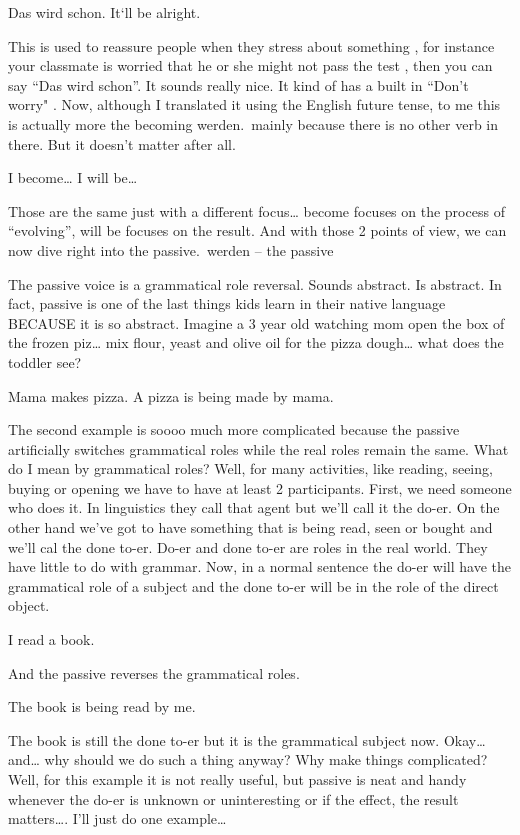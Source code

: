 \documentclass[a4paper,12pt]{article}
\begin{document}
\begin{adjustwidth}{2em}{0pt}
\begin{adjustwidth}{3em}{0pt}
    Das wird schon.
    It‘ll be alright.

This is used to reassure people when they stress about something , for instance
your classmate is worried that he or she might not pass the test , then you can
say “Das wird schon”. It sounds really nice. It kind of has a built in “Don’t
worry" . Now, although I translated it using the English future tense, to me
this is actually more the becoming werden.\ mainly because there is no other
verb in there. But it doesn’t matter after all.

    I become…
    I will be…

Those are the same just with a different focus… become focuses on the process of
“evolving”, will be focuses on the result. And with those 2 points of view, we
can now dive right into the passive.\
werden – the passive

The passive voice is a grammatical role reversal. Sounds abstract. Is abstract. In fact, passive is one of the last things kids learn in their native language BECAUSE it is so abstract. Imagine a 3 year old watching mom open the box of the frozen piz… mix flour, yeast and olive oil for the pizza dough… what does the toddler see?

    Mama makes pizza.
    A pizza is being made by mama.

The second example is soooo much more complicated because the passive artificially switches grammatical roles while the real roles remain the same. What do I mean by grammatical roles? Well, for many activities, like reading, seeing, buying or opening we have to have at least 2 participants. First, we need someone who does it. In linguistics they call that agent but we’ll call it the do-er. On the other hand we’ve got to have something that is being read, seen or bought and we’ll cal the done to-er. Do-er and done to-er are roles in the real world. They have little to do with grammar.
Now, in a normal sentence the do-er will have the grammatical role of a subject and the done to-er will be in the role of the direct object.

    I read a book.

And the passive reverses the grammatical roles.

    The book is being read by me.

The book is still the done to-er but it is the grammatical subject now.
Okay… and… why should we do such a thing anyway? Why make things complicated?
Well, for this example it is not really useful, but passive is neat and handy whenever the do-er is unknown or uninteresting or if the effect, the result matters…. I’ll just do one example…


\end{adjustwidth}
\end{adjustwidth}
\end{document}
